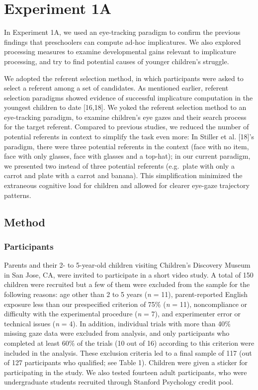 \documentclass{rsos}
\begin{document}
\section{Experiment 1A}\label{experiment-1a}

In Experiment 1A, we used an eye-tracking paradigm to confirm the
previous findings that preschoolers can compute ad-hoc implicatures. We
also explored processing measures to examine developmental gains
relevant to implicature processing, and try to find potential causes of
younger children's struggle.

We adopted the referent selection method, in which participants were
asked to select a referent among a set of candidates. As mentioned
earlier, referent selection paradigms showed evidence of successful
implicature computation in the youngest children to date {[}16,18{]}. We
yoked the referent selection method to an eye-tracking paradigm, to
examine children's eye gazes and their search process for the target
referent. Compared to previous studies, we reduced the number of
potential referents in context to simplify the task even more: In
Stiller et al. {[}18{]}'s paradigm, there were three potential referents in the
context (face with no item, face with only glasses, face with glasses
and a top-hat); in our current paradigm, we presented two instead of
three potential referents (e.g.~plate with only a carrot and plate with
a carrot and banana). This simplification minimized the extraneous
cognitive load for children and allowed for clearer eye-gaze trajectory
patterns.

\subsection{Method}\label{method}

\subsubsection{Participants}\label{participants}

Parents and their 2- to 5-year-old children visiting Children's
Discovery Museum in San Jose, CA, were invited to participate in a short
video study. A total of 150 children were recruited but a few of them
were excluded from the sample for the following reasons: age other than
2 to 5 years (\emph{n} = 11), parent-reported English exposure less than
our prespecified criterion of 75\% (\emph{n} = 11), noncompliance or
difficulty with the experimental procedure (\emph{n} = 7), and
experimenter error or technical issues (\emph{n} = 4). In addition,
individual trials with more than 40\% missing gaze data were excluded
from analysis, and only participants who completed at least 60\% of the
trials (10 out of 16) according to this criterion were included in the
analysis. These exclusion criteria led to a final sample of 117 (out of
127 participants who qualified; see Table 1). Children were given a
sticker for participating in the study. We also tested fourteen adult
participants, who were undergraduate students recruited through Stanford
Psychology credit pool.
\end{document}
